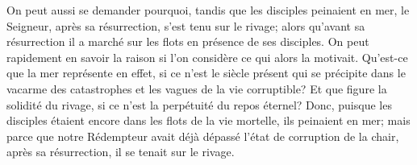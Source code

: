 On peut aussi se demander pourquoi, tandis que les disciples peinaient en mer,
	le Seigneur, après sa résurrection, s’est tenu sur le rivage;
	alors qu’avant sa résurrection il a marché sur les flots
		en présence de ses disciples.
On peut rapidement en savoir la raison
	si l’on considère ce qui alors la motivait.
Qu’est-ce que la mer représente en effet,
	si ce n’est le siècle présent
		qui se précipite dans le vacarme des catastrophes
	et les vagues de la vie corruptible?
Et que figure la solidité du rivage,
	si ce n’est la perpétuité du repos éternel?
Donc, puisque les disciples étaient encore dans les flots de la vie mortelle,
	ils peinaient en mer;
	mais parce que notre Rédempteur
		avait déjà dépassé l’état de corruption de la chair,
	après sa résurrection, il se tenait sur le rivage.
